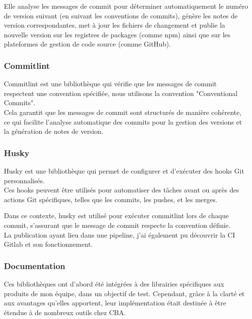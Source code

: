 \documentclass{article}
\begin{document}
Elle analyse les messages de commit pour déterminer automatiquement le numéro de version suivant (en suivant les conventions de commits), génère les notes de version correspondantes, met à jour les fichiers de changement et publie la nouvelle version sur les registres de packages (comme npm) ainsi que sur les plateformes de gestion de code source (comme GitHub).

\subsubsection{Commitlint}

Commitlint est une bibliothèque qui vérifie que les messages de commit respectent une convention spécifiée, nous utilisons la convention "Conventional Commits". \\

Cela garantit que les messages de commit sont structurés de manière cohérente, ce qui facilite l'analyse automatique des commits pour la gestion des versions et la génération de notes de version.

\subsubsection{Husky}

Husky est une bibliothèque qui permet de configurer et d'exécuter des hooks Git personnalisés. \\

Ces hooks peuvent être utilisés pour automatiser des tâches avant ou après des actions Git spécifiques, telles que les commits, les pushes, et les merges.

Dans ce contexte, husky est utilisé pour exécuter commitlint lors de chaque commit, s'assurant que le message de commit respecte la convention définie. \\

La publication ayant lieu dans une pipeline, j'ai également pu découvrir la CI Gitlab et son fonctionnement.

\subsubsection{Documentation}

Ces bibliothèques ont d'abord été intégrées à des librairies spécifiques aux produits de mon équipe, dans un objectif de test. Cependant, grâce à la clarté et aux avantages qu'elles apportent, leur implémentation était destinée à être étendue à de nombreux outils chez CBA. \\
\end{document}
